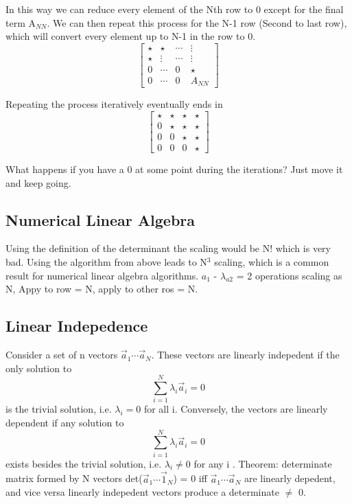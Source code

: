 \documentclass{article}
\newcommand{\be}{\begin{equation}}
\newcommand{\ee}{\end{equation}}
\begin{document}
In this way we can reduce every element of the Nth row to 0 except for the final term A$_{NN}$.
We can then repeat this process for the N-1 row (Second to last row), which will convert every element up to N-1 in the row to 0.%
\be
\begin{bmatrix}
    \star  & \star & \dotsb & \vdots \\
    \star & \vdots &\dotsb &  \vdots \\
    0 & \dotsb &  0 &  \star \\
    0  & \dotsb & 0 &  A_{NN}
\end{bmatrix}
\ee

Repeating the process iteratively eventually ends in
\be
\begin{bmatrix}
    \star  & \star & \star & \star \\
     0 & \star &\star &  \star \\
     0 & 0 &  \star &  \star \\
    0  & 0 & 0 &  \star
\end{bmatrix}
\ee

What happens if you have a 0 at some point during the iterations? Just move it and keep going.

\subsection{Numerical Linear Algebra}
Using the definition of the determinant the scaling would be N! which is very bad.
Using the algorithm from above leads to N$^3$ scaling, which is a common result for numerical linear algebra algorithms.
$a_1$ - $\lambda_{a2}$ = 2 operations scaling as N, Appy to row = N, apply to other ros = N.

\subsection{Linear Indepedence}
Consider a set of n vectors $\vec{a}_1 \cdots \vec{a}_N$.
These vectors are linearly indepedent if the only solution to
\be
  \sum_{i=1}^N \lambda_i\vec{a}_i = 0
\ee
is the trivial solution, i.e. $\lambda_i = 0$ for all i.
Conversely, the vectors are linearly dependent if any solution to
\be
  \sum_{i=1}^N \lambda_i\vec{a}_i = 0
\ee
exists besides the trivial solution, i.e. $\lambda_i \neq 0$ for any i .
Theorem: determinate matrix formed by N vectors det($\vec{a}_1\cdots\vec{1}_N$) = 0 iff $\vec{a}_1\cdots\vec{a}_N$ are linearly depedent, and vice versa linearly indepedent vectors produce a determinate $\neq$ 0.
\end{document}
